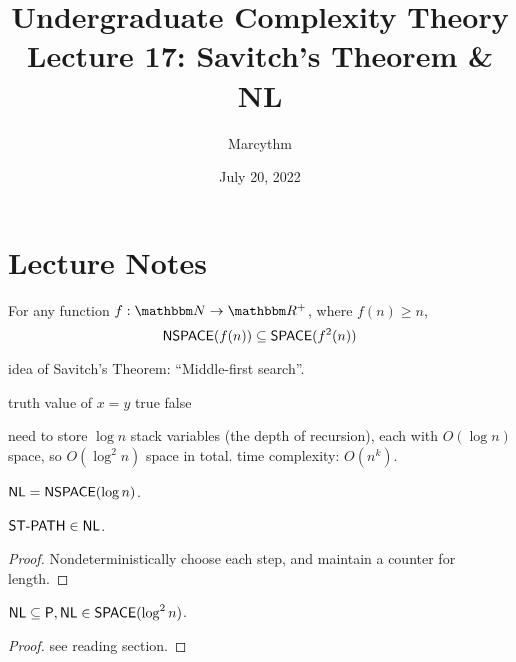 \documentclass{article}
\title{Undergraduate Complexity Theory \\ Lecture 17: Savitch's Theorem \& NL}
\author{Marcythm}
\date{July 20, 2022}
\begin{document}
\maketitle{}

\section{Lecture Notes}

\begin{theorem}
  For any function \(f: \N \to \R^+\), where \(f(n) \geq n\),
  \[ \text{\sf NSPACE}(f(n)) \subseteq \text{\sf SPACE}(f^2(n)) \]
\end{theorem}

idea of Savitch's Theorem: ``Middle-first search''.

\begin{algorithm}
  \begin{algorithmic}
     
        \State \Return truth value of $x = y$
      \Else
            \State \Return true
          \EndIf
        \EndFor
      \EndIf
      \State \Return false
    \EndProcedure
  \end{algorithmic}
\end{algorithm}

need to store \(\log n\) stack variables (the depth of recursion), each with \(O(\log n)\) space, so \(O(\log^2 n)\) space in total. time complexity: \(O(n^k)\).

\begin{definition}
  \( \text{\sf NL} = \text{\sf NSPACE}(\log n)\).
\end{definition}

\begin{proposition}
  \( \text{\sf ST-PATH} \in \text{\sf NL} \).
\end{proposition}

\begin{proof}
  Nondeterministically choose each step, and maintain a counter for length.
\end{proof}

\begin{theorem}
  \( \text{\sf NL} \subseteq \text{\sf P}, \text{\sf NL} \in \text{\sf SPACE}(\log^2 n)\).
\end{theorem}

\begin{proof}
  see reading section.
\end{proof}
\end{document}
